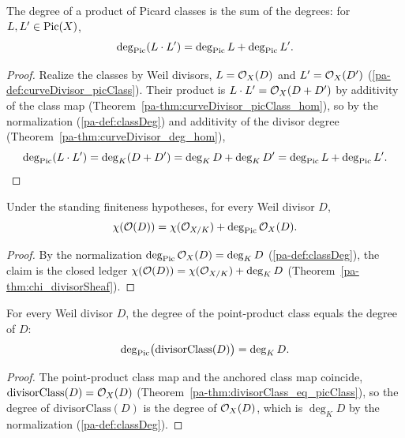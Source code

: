 \begin{theorem}
  \label{pa-thm:classDeg_mul}
  \leanok

  The degree of a product of Picard classes is the sum of the degrees: for \(L, L' \in \operatorname{Pic}(X)\),
  \[
    \deg_{\operatorname{Pic}}(L \cdot L') = \deg_{\operatorname{Pic}} L + \deg_{\operatorname{Pic}} L' .
  \]
\end{theorem}
\begin{proof}
  \leanok
  Realize the classes by Weil divisors, \(L = \mathcal{O}_{X}(D)\) and \(L' = \mathcal{O}_{X}(D')\)
  (\ref{pa-def:curveDivisor_picClass}). Their product is \(L \cdot L' = \mathcal{O}_{X}(D + D')\) by
  additivity of the class map (Theorem~\ref{pa-thm:curveDivisor_picClass_hom}), so by the
  normalization (\ref{pa-def:classDeg}) and additivity of the divisor degree
  (Theorem~\ref{pa-thm:curveDivisor_deg_hom}),
  \[
    \deg_{\operatorname{Pic}}(L \cdot L') = \deg_K(D + D') = \deg_K D + \deg_K D' = \deg_{\operatorname{Pic}} L + \deg_{\operatorname{Pic}}
    L'.
  \]
\end{proof}

\begin{theorem}
  \label{pa-thm:chi_divisorSheaf_classDeg}
  \leanok

  Under the standing finiteness hypotheses, for every Weil divisor \(D\),
  \[
    \chi(\mathcal O(D)) = \chi(\mathcal{O}_{X/K}) + \deg_{\operatorname{Pic}}\mathcal{O}_{X}(D) .
  \]
\end{theorem}
\begin{proof}
  \leanok
  By the normalization \(\deg_{\operatorname{Pic}}\mathcal{O}_{X}(D) = \deg_K D\) (\ref{pa-def:classDeg}), the claim is the
  closed ledger \(\chi(\mathcal O(D)) = \chi(\mathcal{O}_{X/K}) + \deg_K D\)
  (Theorem~\ref{pa-thm:chi_divisorSheaf}).
\end{proof}

\begin{theorem}
  \label{pa-thm:classDeg_divisorClass}
  \leanok

  For every Weil divisor \(D\), the degree of the point-product class equals the degree of \(D\):
  \[
    \deg_{\operatorname{Pic}}\bigl(\mathrm{divisorClass}(D)\bigr) = \deg_K D .
  \]
\end{theorem}
\begin{proof}
  \leanok
  The point-product class map and the anchored class map coincide,
  \(\mathrm{divisorClass}(D) = \mathcal{O}_{X}(D)\) (Theorem~\ref{pa-thm:divisorClass_eq_picClass}), so the
  degree of \(\mathrm{divisorClass}(D)\) is the degree of \(\mathcal{O}_{X}(D)\), which is \(\deg_K D\) by
  the normalization (\ref{pa-def:classDeg}).
\end{proof}


